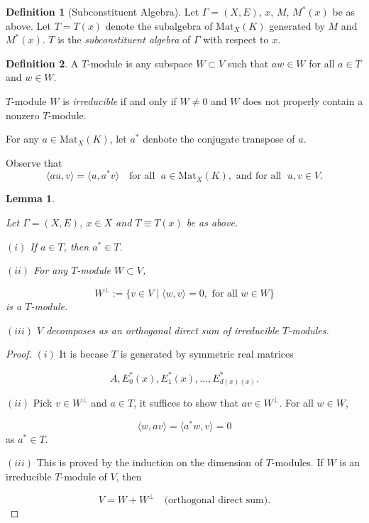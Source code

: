 \documentclass[
]{book}
\newtheorem{lemma}{Lemma}[chapter]
\theoremstyle{definition}
\newtheorem{definition}{Definition}[chapter]
\theoremstyle{definition}
\theoremstyle{definition}
\theoremstyle{definition}
\theoremstyle{remark}
\begin{document}
\begin{definition}[Subconstituent Algebra]
Let \(\Gamma = (X, E)\), \(x\), \(M\), \(M^*(x)\) be as above. Let \(T = T(x)\) denote the subalgebra of \(\mathrm{Mat}_X(K)\) generated by \(M\) and \(M^*(x)\). \(T\) is the \emph{subconstituent algebra} of \(\Gamma\) with respect to \(x\).
\end{definition}

\begin{definition}
A \(T\)-module  is any subspace \(W\subset V\) such that \(aw\in W\) for all \(a\in T\) and \(w\in W\).

\(T\)-module \(W\) is \emph{irreducible} if and only if \(W\neq 0\) and \(W\) does not properly contain a nonzero \(T\)-module.
\end{definition}

For any \(a\in \mathrm{Mat}_X(K)\), let \(a^*\) denbote the conjugate transpose of \(a\).

Observe that
\[\langle au, v\rangle = \langle u, a^*v\rangle \quad \textrm{for all }\; a\in \mathrm{Mat}_X(K), \textrm{ and for all } \; u,v\in V.\]

\begin{lemma}
\protect\hypertarget{lem:complete-reducibility}{}\label{lem:complete-reducibility}

Let \(\Gamma = (X,E)\), \(x\in X\) and \(T \equiv T(x)\) be as above.

\((i)\) If \(a\in T\), then \(a^*\in T\).

\((ii)\) For any \(T\)-module \(W\subset V\),

\[W^\bot := \{v\in V\mid \langle w, v\rangle = 0, \textrm{ for all }w\in W\}\]
is a \(T\)-module.

\((iii)\) \(V\) decomposes as an orthogonal direct sum of irreducible \(T\)-modules.

\end{lemma}

\begin{proof}
\leavevmode

\((i)\) It is becase \(T\) is generated by symmetric real matrices

\[A, E^*_0(x), E^*_1(x), \ldots, E^*_{d(x)(x)}.\]

\((ii)\) Pick \(v\in W^\bot\) and \(a\in T\), it suffices to show that \(av\in W^\bot\). For all \(w\in W\),

\[\langle w, av\rangle = \langle a^*w, v\rangle = 0\]
as \(a^*\in T\).

\((iii)\) This is proved by the induction on the dimension of \(T\)-modules. If \(W\) is an irreducible \(T\)-module of \(V\), then

\[V = W + W^\bot \quad \textrm{(orthogonal direct sum)}.\]

\end{proof}
\end{document}
